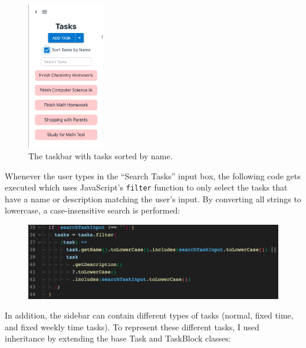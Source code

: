 \documentclass[notitlepage, 12pt]{report}
\newcommand{\code}[1]{\texttt{#1}}
\begin{document}
\begin{figure}[H]
	\centering
	\caption{The taskbar with tasks sorted by name.}
	\includegraphics[width=0.3\textwidth]{sorted-taskbar.png}
\end{figure}

Whenever the user types in the ``Search Tasks'' input box, the following code gets executed which uses JavaScript's \code{filter} function to only select the tasks that have a name or description matching the user's input. By converting all strings to lowercase, a case-insensitive search is performed:

\begin{figure}[H]
	\includegraphics[width=\textwidth]{filtering-tasks.png}
\end{figure}

\newpage

In addition, the sidebar can contain different types of tasks (normal, fixed time, and fixed weekly time tasks). To represent these different tasks, I used inheritance by extending the base Task and TaskBlock classes:
\end{document}
